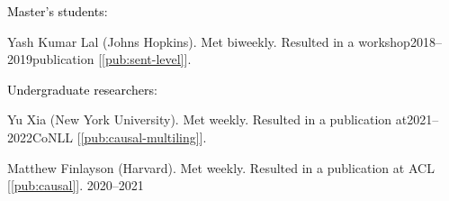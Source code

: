 \documentclass[10pt]{article}
\renewcommand{\section}[1]{\pagebreak[3]%
	\vspace{0.5\baselineskip}%
	\phantomsection\addcontentsline{toc}{section}{#1}%
	\noindent\llap{\bf\scshape\smash{\parbox[t]{\marginparwidth}{\hyphenpenalty=10000\raggedright \textcolor{black}{#1}}}}%
	\vspace{-\baselineskip}\par}
\renewcommand{\subsection}[1]{\textcolor{black}{#1}}
\newcommand{\halfblankline}{\quad\vspace{-0.5\baselineskip}\pagebreak[3]}
\begin{document}
	\subsection{Master's students}:
	\begin{innerlist}
	\item[\textbullet] Yash Kumar Lal (Johns Hopkins). Met biweekly. Resulted in a workshop\hfill 2018--2019\newline publication [\ref{pub:sent-level}].
	\end{innerlist}

	\halfblankline\vspace{-0.5pt}
	
	\subsection{Undergraduate researchers}:
	\begin{innerlist}
	\item[\textbullet] Yu Xia (New York University). Met weekly. Resulted in a publication at\hfill 2021--2022\newline CoNLL [\ref{pub:causal-multiling}].

	\item[\textbullet] Matthew Finlayson (Harvard). Met weekly. Resulted in a publication at ACL [\ref{pub:causal}].
	\hfill 2020--2021
	\end{innerlist}
	
	
	
	
\end{document}
